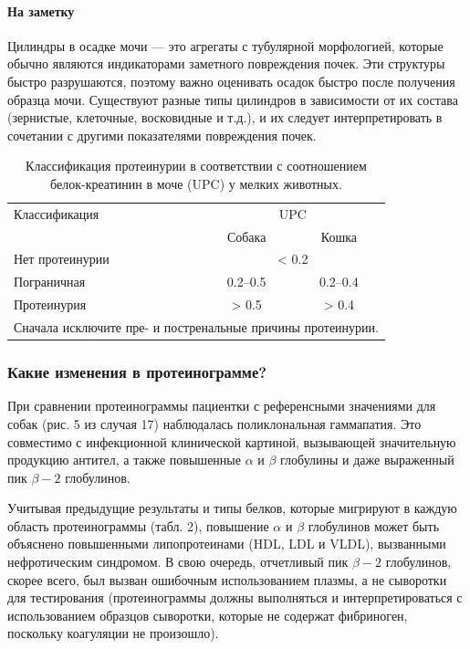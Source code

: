 \documentclass[a4paper,12pt]{book}
\begin{document}
\paragraph{На заметку}
Цилиндры в осадке мочи — это агрегаты с тубулярной морфологией, которые обычно являются индикаторами заметного повреждения почек. Эти структуры быстро разрушаются, поэтому важно оценивать осадок быстро после получения образца мочи. Существуют разные типы цилиндров в зависимости от их состава (зернистые, клеточные, восковидные и т.д.), и их следует интерпретировать в сочетании с другими показателями повреждения почек.

\begin{table}[htbp]
\centering
\caption{Классификация протеинурии в соответствии с соотношением белок-креатинин в моче (UPC) у мелких животных.}
\begin{tabular}{lcc}
\toprule
Классификация & \multicolumn{2}{c}{UPC} \\
& Собака & Кошка \\
\midrule
Нет протеинурии & \multicolumn{2}{c}{< 0.2} \\
Пограничная & 0.2--0.5 & 0.2--0.4 \\
Протеинурия & > 0.5 & > 0.4 \\
\bottomrule
\multicolumn{3}{l}{Сначала исключите пре- и постренальные причины протеинурии.}
\end{tabular}
\end{table}

\subsubsection*{Какие изменения в протеинограмме?}
При сравнении протеинограммы пациентки с референсными значениями для собак (рис. 5 из случая 17) наблюдалась поликлональная гаммапатия. Это совместимо с инфекционной клинической картиной, вызывающей значительную продукцию антител, а также повышенные $\alpha$ и $\beta$ глобулины и даже выраженный пик $\beta - 2$ глобулинов.

Учитывая предыдущие результаты и типы белков, которые мигрируют в каждую область протеинограммы (табл. 2), повышение $\alpha$ и $\beta$ глобулинов может быть объяснено повышенными липопротеинами (HDL, LDL и VLDL), вызванными нефротическим синдромом. В свою очередь, отчетливый пик $\beta - 2$ глобулинов, скорее всего, был вызван ошибочным использованием плазмы, а не сыворотки для тестирования (протеинограммы должны выполняться и интерпретироваться с использованием образцов сыворотки, которые не содержат фибриноген, поскольку коагуляции не произошло).
\end{document}
